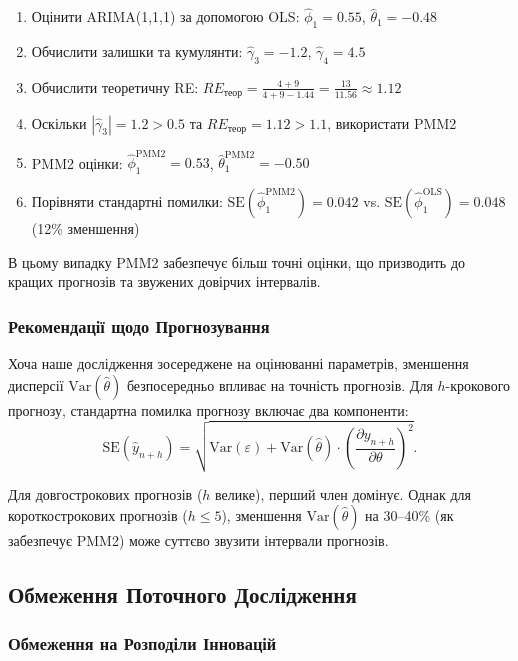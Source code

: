 \documentclass[12pt,a4paper]{article}
\begin{document}
	\begin{enumerate}
		\item Оцінити ARIMA(1,1,1) за допомогою OLS: $\hat{\phi}_1 = 0.55$, $\hat{\theta}_1 = -0.48$
		\item Обчислити залишки та кумулянти: $\hat{\gamma}_3 = -1.2$, $\hat{\gamma}_4 = 4.5$
		\item Обчислити теоретичну RE: $RE_{\text{теор}} = \frac{4 + 9}{4 + 9 - 1.44} = \frac{13}{11.56} \approx 1.12$
		\item Оскільки $|\hat{\gamma}_3| = 1.2 > 0.5$ та $RE_{\text{теор}} = 1.12 > 1.1$, використати PMM2
		\item PMM2 оцінки: $\hat{\phi}_1^{\text{PMM2}} = 0.53$, $\hat{\theta}_1^{\text{PMM2}} = -0.50$
		\item Порівняти стандартні помилки: $\text{SE}(\hat{\phi}_1^{\text{PMM2}}) = 0.042$ vs. $\text{SE}(\hat{\phi}_1^{\text{OLS}}) = 0.048$ (12\% зменшення)
	\end{enumerate}
	
	В цьому випадку PMM2 забезпечує більш точні оцінки, що призводить до кращих прогнозів та звужених довірчих інтервалів.
	
	\subsubsection{Рекомендації щодо Прогнозування}
	
	Хоча наше дослідження зосереджене на оцінюванні параметрів, зменшення дисперсії $\text{Var}(\hat{\theta})$ безпосередньо впливає на точність прогнозів. Для $h$-крокового прогнозу, стандартна помилка прогнозу включає два компоненти:
	\begin{equation}
		\text{SE}(\hat{y}_{n+h}) = \sqrt{\text{Var}(\varepsilon) + \text{Var}(\hat{\theta}) \cdot \left(\frac{\partial y_{n+h}}{\partial \theta}\right)^2}.
	\end{equation}
	
	Для довгострокових прогнозів ($h$ велике), перший член домінує. Однак для короткострокових прогнозів ($h \leq 5$), зменшення $\text{Var}(\hat{\theta})$ на 30--40\% (як забезпечує PMM2) може суттєво звузити інтервали прогнозів.
	
	\subsection{Обмеження Поточного Дослідження}
	\label{subsec:limitations}
	
	\subsubsection{Обмеження на Розподіли Інновацій}
	
\end{document}
